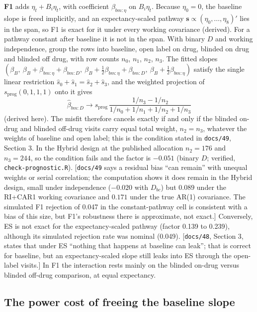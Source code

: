 \documentclass[11pt]{article}
\newcommand{\note}[1]{\textcolor{blue!60!black}{\small [#1]}}
\newcommand{\code}[1]{\texttt{#1}}
\begin{document}
\textbf{F1} adds $\eta_t + B_i\eta_t$, with coefficient $\beta_{bm:\eta}$
on $B_i\eta_t$. Because $\eta_0 = 0$, the baseline slope is freed
implicitly, and an expectancy-scaled pathway
$\mathbf s \propto (\eta_0, \dots, \eta_8)'$ lies in the span, so F1 is
exact for it under every working covariance (derived). For a pathway
constant after baseline it is not in the span. With binary $D$ and
working independence, group the rows into baseline, open label on
drug, blinded on drug and blinded off drug, with row counts $n_0$,
$n_1$, $n_2$, $n_3$. The fitted slopes $(\beta_B,\ \beta_B +
\beta_{bm:\eta} + \beta_{bm:D},\ \beta_B + \tfrac12\beta_{bm:\eta} +
\beta_{bm:D},\ \beta_B + \tfrac12\beta_{bm:\eta})$ satisfy the single
linear restriction $\hat s_0 + \hat s_1 = \hat s_2 + \hat s_3$, and the weighted projection
of $s_{\text{prog}}(0,1,1,1)$ onto it gives
\begin{equation}
\hat\beta_{bm:D} \to s_{\text{prog}}\,
  \frac{1/n_3 - 1/n_2}{1/n_0 + 1/n_1 + 1/n_2 + 1/n_3}
\label{eq:bp-f1-leak}
\end{equation}
(derived here). The misfit therefore cancels exactly if and only if the
blinded on-drug and blinded off-drug visits carry equal total weight,
$n_2 = n_3$, whatever the weights of baseline and open label; this is
the condition stated in \code{docs/49}, Section 3. In the Hybrid design
at the published allocation $n_2 = 176$ and $n_3 = 244$, so the
condition fails and the factor is $-0.051$ (binary $D$; verified,
\code{check-prognostic.R}). \note{\code{docs/49} says a residual bias
``can remain'' with unequal weights or serial correlation; the
computation shows it does remain in the Hybrid design, small under
independence ($-0.020$ with $D_{bc}$) but $0.089$ under the RI+CAR1
working covariance and $0.171$ under the true AR(1) covariance. The
simulated F1 rejection of 0.047 in the constant-pathway cell is
consistent with a bias of this size, but F1's robustness there is
approximate, not exact.} Conversely, ES is not exact for the
expectancy-scaled pathway (factor 0.139 to 0.239), although its
simulated rejection rate was nominal (0.049). \note{\code{docs/48},
Section 3, states that under ES ``nothing that happens at baseline can
leak''; that is correct for baseline, but an expectancy-scaled slope
still leaks into ES through the open-label visits.} In F1 the
interaction rests mainly on the blinded on-drug versus blinded
off-drug comparison, at equal expectancy.

\subsection{The power cost of freeing the baseline slope}
\end{document}
